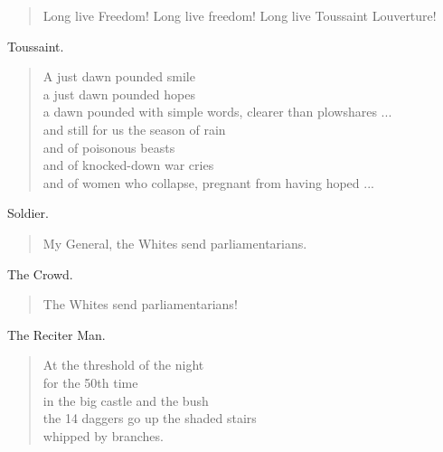 \documentclass[letterpaper,article,12pt,oneside,notitlepage]{memoir}
\begin{document}
\begin{verse}
Long live Freedom! Long live freedom! Long live Toussaint Louverture! \\
\end{verse}

\clearpage

\begin{center}Toussaint.\end{center}

\begin{verse}
A just dawn pounded smile \\
a just dawn pounded hopes \\
a dawn pounded with simple words, clearer than plowshares ... \\
and still for us the season of rain \\
and of poisonous beasts \\
and of knocked-down war cries \\
and of women who collapse, pregnant from having hoped ... \\
\end{verse}

\begin{center}Soldier.\end{center}

\begin{verse}
\hspace{1cm} My General, the Whites send parliamentarians. \\
\end{verse}

\begin{center}The Crowd.\end{center}

\begin{verse}
The Whites send parliamentarians! \\
\end{verse}

\begin{center}The Reciter Man.\end{center}

\begin{verse}
At the threshold of the night \\
for the 50th time \\
in the big castle and the bush \\
the 14 daggers go up the shaded stairs \\
whipped by branches. \\
\end{verse}
\end{document}

